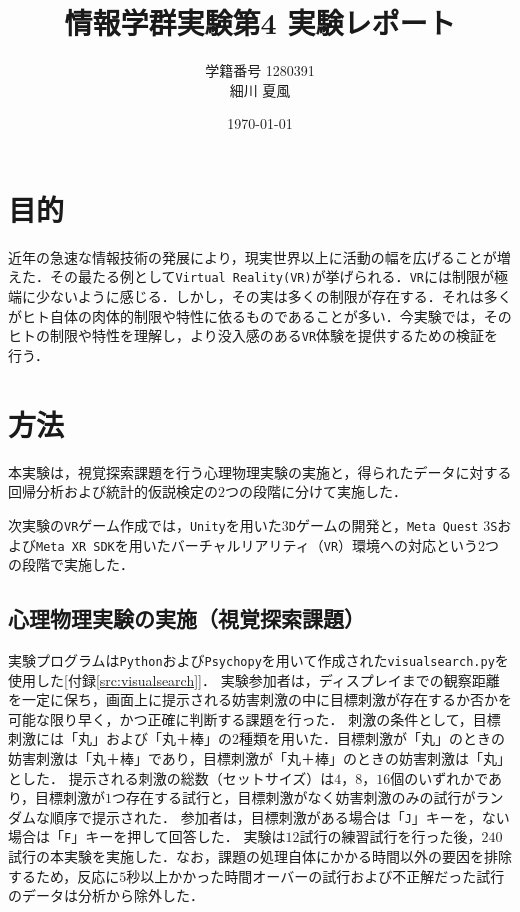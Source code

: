 \documentclass[paper=a4, fontsize=10pt]{jlreq}
\title{情報学群実験第4 実験レポート}
\author{学籍番号 1280391 \\ 細川 夏風}
\date{\today}
\begin{document}
\maketitle

\section{目的}
近年の急速な情報技術の発展により，現実世界以上に活動の幅を広げることが増えた．その最たる例として\texttt{Virtual Reality(VR)}が挙げられる．\texttt{VR}には制限が極端に少ないように感じる．しかし，その実は多くの制限が存在する．それは多くがヒト自体の肉体的制限や特性に依るものであることが多い．今実験では，そのヒトの制限や特性を理解し，より没入感のある\texttt{VR}体験を提供するための検証を行う．

\section{方法}
本実験は，視覚探索課題を行う心理物理実験の実施と，得られたデータに対する回帰分析および統計的仮説検定の$2$つの段階に分けて実施した．

次実験の\texttt{VR}ゲーム作成では，\texttt{Unity}を用いた$3$\texttt{D}ゲームの開発と，\texttt{Meta Quest} $3$\texttt{S}および\texttt{Meta XR SDK}を用いたバーチャルリアリティ（\texttt{VR}）環境への対応という$2$つの段階で実施した．

\subsection{心理物理実験の実施（視覚探索課題）}
実験プログラムは\texttt{Python}および\texttt{Psychopy}を用いて作成された\texttt{visualsearch.py}を使用した[付録\ref{src:visualsearch}]．
実験参加者は，ディスプレイまでの観察距離を一定に保ち，画面上に提示される妨害刺激の中に目標刺激が存在するか否かを可能な限り早く，かつ正確に判断する課題を行った．
刺激の条件として，目標刺激には「丸」および「丸＋棒」の$2$種類を用いた．目標刺激が「丸」のときの妨害刺激は「丸＋棒」であり，目標刺激が「丸＋棒」のときの妨害刺激は「丸」とした．
提示される刺激の総数（セットサイズ）は$4$，$8$，$16$個のいずれかであり，目標刺激が$1$つ存在する試行と，目標刺激がなく妨害刺激のみの試行がランダムな順序で提示された．
参加者は，目標刺激がある場合は「\texttt{J}」キーを，ない場合は「\texttt{F}」キーを押して回答した．
実験は$12$試行の練習試行を行った後，$240$試行の本実験を実施した．なお，課題の処理自体にかかる時間以外の要因を排除するため，反応に$5$秒以上かかった時間オーバーの試行および不正解だった試行のデータは分析から除外した．
\end{document}
